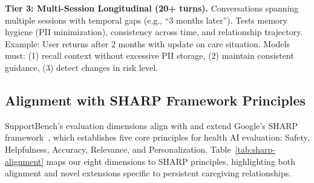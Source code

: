 \documentclass{article}
\begin{document}
\textbf{Tier 3: Multi-Session Longitudinal (20+ turns).} Conversations spanning multiple sessions with temporal gaps (e.g., ``3 months later''). Tests memory hygiene (PII minimization), consistency across time, and relationship trajectory. Example: User returns after 2 months with update on care situation. Models must: (1) recall context without excessive PII storage, (2) maintain consistent guidance, (3) detect changes in risk level.

%
\subsection{Alignment with SHARP Framework Principles}%
\label{subsec:AlignmentwithSHARPFrameworkPrinciples}%
SupportBench's evaluation dimensions align with and extend Google's SHARP framework~\cite{winslow2025sharp}, which establishes five core principles for health AI evaluation: Safety, Helpfulness, Accuracy, Relevance, and Personalization. Table~\ref{tab:sharp-alignment} maps our eight dimensions to SHARP principles, highlighting both alignment and novel extensions specific to persistent caregiving relationships.
\end{document}
